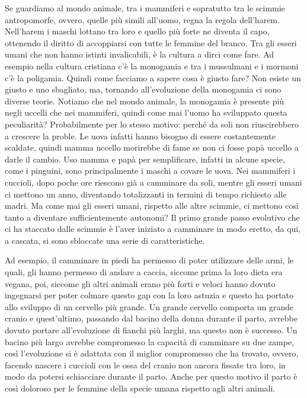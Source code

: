 \documentclass[12pt]{book} %
\begin{document}
\bigskip

Se guardiamo al mondo animale, tra i mammiferi e sopratutto tra le scimmie antropomorfe, ovvero, quelle più simili
all'uomo, regna la regola dell'harem. Nell'harem i
maschi lottano tra loro e quello più forte ne diventa il capo, ottenendo il diritto di accoppiarsi con tutte le femmine
del branco. Tra gli esseri umani che non hanno istinti invalicabili, è la cultura a dirci come fare. Ad
esempio nella cultura cristiana c'è la monogamia e tra i mussulmani e i mormoni c'è la poligamia. Quindi come facciamo a sapere
cosa è giusto fare? Non esiste un giusto e uno sbagliato, ma, tornando all'evoluzione
della monogamia ci sono diverse teorie. Notiamo che nel mondo animale, la monogamia è presente più negli uccelli che
nei mammiferi, quindi come mai l'uomo ha sviluppato questa peculiarità? Probabilmente per lo
stesso motivo: perché da soli non riuscirebbero a crescere la proble. Le uova infatti hanno bisogno di essere costantemente scaldate, quindi
mamma uccello morirebbe di fame se non ci fosse papà uccello a darle il cambio. Uso mamma e papà per semplificare,
infatti in alcune specie, come i pinguini, sono principalmente i maschi a covare le uova. Nei mammiferi i cuccioli,
dopo poche ore riescono già a camminare da soli, mentre gli esseri umani ci mettono un anno, diventando totalizzanti in
termini di tempo richiesto alle madri. Ma come mai gli esseri umani, rispetto alle altre scimmie, ci mettono così tanto
a diventare sufficientemente autonomi? Il primo grande passo evolutivo che ci ha staccato dalle scimmie è
l'aver iniziato a camminare in modo eretto, da qui, a cascata, si sono sbloccate una serie di
caratteristiche. 

Ad esempio, il camminare in piedi ha permesso di poter utilizzare delle armi, le quali, gli hanno permesso di andare a
caccia, siccome prima la loro dieta era vegana, poi, siccome gli altri animali erano più forti e veloci hanno dovuto
ingegnarsi per poter colmare questo gap con la loro astuzia e questo ha portato allo sviluppo di un cervello più grande.
Un grande cervello comporta un grande cranio e quest'ultimo,
passando dal bacino della donna durante il parto, avrebbe dovuto portare all'evoluzione di fianchi
più larghi, ma questo non è successo. Un bacino più largo avrebbe compromesso la capacità di camminare su due zampe,
così l'evoluzione si è adattata con il miglior compromesso che ha trovato, ovvero, facendo nascere
i cuccioli con le ossa del cranio non ancora fissate tra loro, in modo da potersi schiacciare durante il parto. Anche
per questo motivo il parto è così doloroso per le femmine della specie umana rispetto agli altri animali. 
\end{document}
